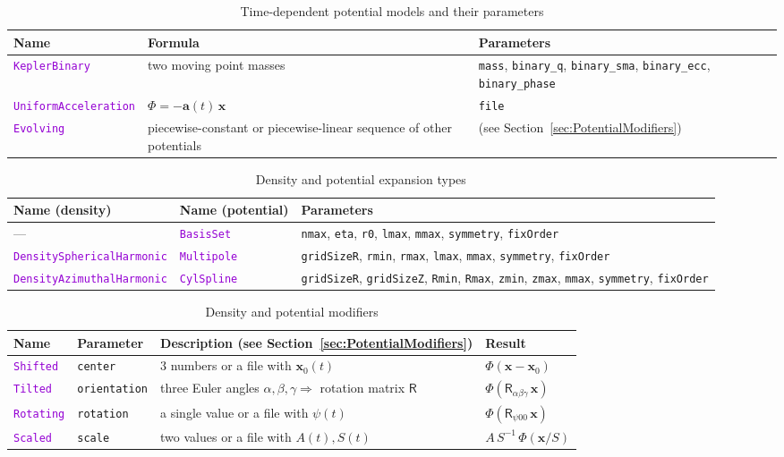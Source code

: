 \documentclass[12pt]{article}
\newcommand{\ttt}[1]{\textcolor{darkviolet}{\texttt{#1}}}
\newcommand{\ppp}[1]{\textcolor{darkolive} {\texttt{#1}}}
\begin{document}
\begin{table}
\caption{Time-dependent potential models and their parameters}  \label{tab:PotentialTimeDependent}
\begin{tabular}{l p{60mm} p{55mm}}
Name & Formula & Parameters \\
\hline
\ttt{KeplerBinary} & two moving point masses & \ppp{mass}, \ppp{binary_q}, \ppp{binary_sma}, \ppp{binary_ecc}, \ppp{binary_phase} \\[2mm]
\ttt{UniformAcceleration} & $\Phi=-\boldsymbol a(t)\,\boldsymbol x$ & \ppp{file} \\[2mm]
\ttt{Evolving} & piecewise-constant or piecewise-linear sequence of other potentials & (see Section~\ref{sec:PotentialModifiers})
\end{tabular}
\end{table}

\begin{table}
\caption{Density and potential expansion types}  \label{tab:ExpansionParams}
\begin{tabular}{l l p{7cm}}
Name (density) & Name (potential) & Parameters \\
\hline
--- & \ttt{BasisSet} & \ppp{nmax}, \ppp{eta}, \ppp{r0}, \ppp{lmax}, \ppp{mmax}, \ppp{symmetry}, \ppp{fixOrder} \\
\ttt{DensitySphericalHarmonic} & \ttt{Multipole} & \ppp{gridSizeR}, \ppp{rmin}, \ppp{rmax}, \ppp{lmax}, \ppp{mmax}, \ppp{symmetry}, \ppp{fixOrder}\\
\ttt{DensityAzimuthalHarmonic} & \ttt{CylSpline} & \ppp{gridSizeR}, \ppp{gridSizeZ}, \ppp{Rmin}, \ppp{Rmax}, \ppp{zmin}, \ppp{zmax}, \ppp{mmax}, \ppp{symmetry}, \ppp{fixOrder}
\end{tabular}
\end{table}

\begin{table}
\caption{Density and potential modifiers}  \label{tab:PotentialModifiers}
\begin{tabular}{l l l l} %
Name & Parameter & Description (see Section~\ref{sec:PotentialModifiers}) & Result \\
\hline
\ttt{Shifted} & \ppp{center} & 3 numbers or a file with $\boldsymbol{x}_0(t)$ & $\Phi(\boldsymbol x-\boldsymbol x_0)$\\
\ttt{Tilted} & \ppp{orientation} & three Euler angles $\alpha,\beta,\gamma\Rightarrow$ rotation matrix $\mathsf{R}$ & $\Phi(\mathsf{R}_{\alpha\beta\gamma}\, \boldsymbol x)$ \\
\ttt{Rotating} & \ppp{rotation} & a single value or a file with $\psi(t)$ & $\Phi(\mathsf{R}_{\psi 0 0}\, \boldsymbol x)$ \\
\ttt{Scaled} & \ppp{scale} & two values or a file with $A(t), S(t)$ & $A\,S^{-1}\,\Phi(\boldsymbol x/S)$
\end{tabular}
\end{table}
\end{document}
